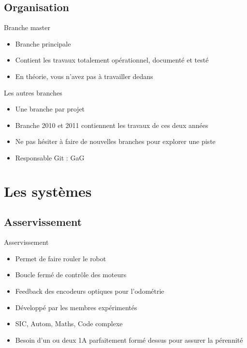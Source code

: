 \documentclass{beamer}
\begin{document}
\subsection{Organisation}
\begin{frame}{Branche master}
	\begin{itemize}
		\item Branche principale
		\item Contient les travaux totalement opérationnel, documenté et testé
		\item En théorie, vous n'avez pas à travailler dedans
	\end{itemize}
\end{frame}

\begin{frame}{Les autres branches}
	\begin{itemize}
		\item Une branche par projet
		\item Branche 2010 et 2011 contiennent les travaux de ces deux années
		\item Ne pas hésiter à faire de nouvelles branches pour explorer une piste
		\item Responsable Git : GaG
	\end{itemize}
\end{frame}

\section{Les systèmes}
\subsection{Asservissement}
\begin{frame}{Asservissement}
	\begin{itemize}
		\item Permet de faire rouler le robot
		\item Boucle fermé de contrôle des moteurs
		\item Feedback des encodeurs optiques pour l'odométrie
		\item Développé par les membres expérimentés
		\item SIC, Autom, Maths, Code complexe
		\item Besoin d'un ou deux 1A parfaitement formé dessus pour assurer la pérennité
	\end{itemize}
\end{frame}
\end{document}
